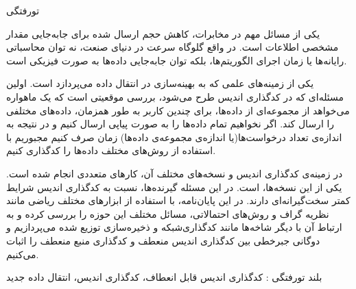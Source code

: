 


\begin{وسط‌چین}
\end{وسط‌چین}
‌تورفتگی

یکی از مسائل مهم در مخابرات، کاهش حجم ارسال شده برای جابه‌جایی مقدار مشخصی اطلاعات است. در واقع گلوگاه سرعت در دنیای صنعت، نه توان محاسباتی رایانه‌ها یا زمان اجرای الگوریتم‌ها، بلکه توان جابه‌جایی داده‌ها به صورت فیزیکی است.

یکی از زمینه‌های علمی که به بهینه‌سازی در انتقال داده می‌پردازد است. اولین مسئله‌ای که در کدگذاری اندیس طرح می‌شود، بررسی موقعیتی است که یک ماهواره می‌خواهد از مجموعه‌ای از داده‌ها، برای چندین کاربر به طور همزمان، داده‌های مختلفی را ارسال کند. اگر نخواهیم تمام داده‌ها را به صورت پیاپی ارسال کنیم و در نتیجه به اندازه‌ی تعداد درخواست‌ها(یا اندازه‌ی مجموعه‌ی داده‌ها) زمان صرف کنیم مجبوریم با استفاده از روش‌های مختلف داده‌ها را کدگذاری کنیم.

در زمینه‌ی کدگذاری اندیس و نسخه‌های مختلف آن، کارهای متعددی انجام شده است. یکی از این نسخه‌ها،  است. در این مسئله گیرنده‌ها، نسبت به کدگذاری اندیس شرایط کمتر سخت‌گیرانه‌ای دارند. در این پایان‌‌نامه، با استفاده از ابزارهای مختلف ریاضی مانند نظریه گراف و روش‌های احتمالاتی، مسائل مختلف این حوزه را بررسی کرده و به ارتباط آن با دیگر شاخه‌ها مانند کدگذار‌ی‌شبکه و ذخیره‌سازی توزیع شده می‌پردازیم و دوگانی جبرخطی بین کدگذاری اندیس منعطف و کدگذاری منبع منعطف را اثبات می‌کنیم.

‌بلند
‌تورفتگی :
کدگذاری اندیس قابل انعطاف، کدگذاری اندیس، انتقال داده
‌جدید
